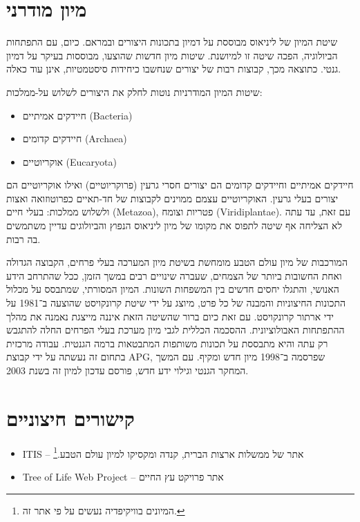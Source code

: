 \documentclass{article}
\begin{document}
\section{מיון מודרני}

שיטת המיון של ליניאוס מבוססת על דמיון בתכונות היצורים ובמראם. כיום, עם
התפתחות הביולוגיה, הפכה שיטה זו למיושנת. שיטות מיון חדשות שהוצעו,
מבוססות בעיקר על דמיון גנטי. כתוצאה מכך, קבוצות רבות של יצורים שנחשבו
כיחידות סיסטמטיות, אינן עוד כאלה.

שיטות המיון המודרניות נוטות לחלק את היצורים לשלוש על-ממלכות:

\begin{itemize}
  \item חיידקים אמיתיים (Bacteria)
  \item חיידקים קדומים (Archaea)
  \item אוקריוטיים (Eucaryota)
\end{itemize}

חיידקים אמיתיים וחיידקים קדומים הם יצורים חסרי גרעין (פרוקריוטיים)
ואילו אוקריוטיים הם יצורים בעלי גרעין. האוקריוטיים עצמם ממוינים לקבוצות
של חד-תאיים כפרוטוזואה ואצות ולשלוש ממלכות: בעלי חיים (Metazoa), פטריות
וצומח (Viridiplantae). עם זאת, עד עתה לא הצליחה אף שיטה לתפוס את מקומו
של מיון ליניאוס הנפוץ והביולוגים עדיין משתמשים בה רבות.

המורכבות של מיון עולם הטבע מומחשת בשיטת מיון המערכה בעלי פרחים, הקבוצה
הגדולה ואחת החשובות ביותר של הצמחים, שעברה שינויים רבים במשך הזמן, ככל
שהתרחב הידע האנושי, והתגלו יחסים חדשים בין המשפחות השונות. המיון
המסורתי, שמתבסס על מכלול התכונות החיצוניות והמבנה של כל פרט, מיוצג על
ידי שיטת קרונקויסט שהוצעה ב־1981 על ידי ארתור קרונקויסט. עם זאת כיום
ברור שהשיטה הזאת איננה מייצגת נאמנה את מהלך ההתפתחות האבולוציונית.
ההסכמה הכללית לגבי מיון מערכת בעלי הפרחים החלה להתגבש רק עתה והיא
מתבססת על תכונות משותפות המתבטאות ברמה הגנטית. עבודה מרכזית בתחום זה
נעשתה על ידי קבוצת APG, שפרסמה ב־1998 מיון חדש ומקיף. עם המשך המחקר
הגנטי וגילוי ידע חדש, פורסם עדכון למיון זה בשנת 2003.

\section{קישורים חיצוניים}

\begin{itemize}
  \item ITIS – אתר של ממשלות ארצות הברית, קנדה ומקסיקו למיון עולם
  הטבע.\footnote{המיונים בוויקיפדיה נעשים על פי אתר זה.}
  \item Tree of Life Web Project – אתר פרויקט עץ החיים
\end{itemize}
\end{document}
